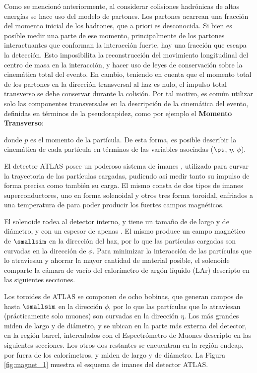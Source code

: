 Como se mencionó anteriormente, al considerar colisiones hadrónicas de altas energías se hace uso del modelo de partones. Los partones acarrean una fracción del momento inicial de los hadrones, que a priori es desconocida. Si bien es posible medir una parte de ese momento, principalmente de los partones interactuantes que conforman la interacción fuerte, hay una fracción que escapa la detección. Esto imposibilita la reconstrucción del movimiento longitudinal del centro de masa en la interacción, y hacer uso de leyes de conservación sobre la cinemática total del evento. En cambio, teniendo en cuenta que el momento total de los partones en la dirección transversal al haz es nulo, el impulso total transverso se debe conservar durante la colisión. Por tal motivo, es común utilizar solo las componentes transversales en la descripción de la cinemática del evento, definidas en términos de la pseudorapidez, como por ejemplo el \textbf{Momento Transverso}:


donde $p$ es el momento de la partícula. De esta forma, es posible describir la cinemática de cada partícula en términos de las variables asociadas ($\pt$, $\eta$, $\phi$).


El detector ATLAS posee un poderoso sistema de imanes \cite{tenKate:409763}, utilizado para curvar la trayectoria de las partículas cargadas, pudiendo así medir tanto su impulso de forma precisa como también su carga. El mismo consta de dos tipos de imanes superconductores, uno en forma solenoidal y otros tres forma toroidal, enfriados a una temperatura de  para poder producir los fuertes campos magnéticos.

El solenoide rodea al detector interno, y tiene un tamaño de  de largo y  de diámetro, 
y con un espesor de apenas . El mismo produce un campo magnético de {$\smallsim$} en la dirección del haz, por lo que las partículas cargadas son curvadas en la dirección de $\phi$. Para minimizar la interacción de las partículas que lo atraviesan y ahorrar la mayor cantidad de material posible, el solenoide comparte la cámara de vacío del calorímetro de argón líquido (LAr) descripto en las siguientes secciones.

Los toroides de ATLAS se componen de ocho bobinas, que generan campos de hasta {$\smallsim$} en la dirección $\phi$, por lo que las partículas que lo atraviesan (prácticamente solo muones) son curvadas en la dirección $\eta$. Los más grandes miden  de largo y  de diámetro, y se ubican en la parte más externa del detector, en la región barrel, intercalados con el Espectrómetro de Muones descripto en las siguientes secciones. Los otros dos restantes se encuentran en la región endcap, por fuera de los calorímetros, y miden  de largo y  de diámetro. La Figura \ref{fig:magnet_1} muestra el esquema de imanes del detector ATLAS.


